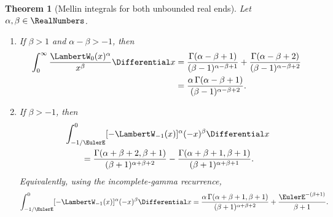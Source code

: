 \documentclass[11pt]{article}
\newtheorem{theorem}{Theorem}[section]
\theoremstyle{remark}
\newcommand{\Wz}{\LambertW_{0}}
\newcommand{\Wm}{\LambertW_{-1}}
\begin{document}
\begin{theorem}[Mellin integrals for both unbounded real ends]
\label{thm:mellin-integrals}
Let \(\alpha,\beta\in\RealNumbers\).
\begin{enumerate}[label=\textup{(\roman*)}]
\item If \(\beta>1\) and \(\alpha-\beta>-1\), then
\begin{align}
 \int_0^\infty \frac{\Wz(x)^\alpha}{x^\beta}\Differential x
 &=\frac{\Gamma(\alpha-\beta+1)}
       {(\beta-1)^{\alpha-\beta+1}}
  +\frac{\Gamma(\alpha-\beta+2)}
       {(\beta-1)^{\alpha-\beta+2}}
 \label{eq:mellin-W0}\\
 &=\frac{\alpha\,\Gamma(\alpha-\beta+1)}
 { (\beta-1)^{\alpha-\beta+2}}.
 \label{eq:mellin-W0-simple}
\end{align}
\item If \(\beta>-1\), then
\begin{align}
 &\int_{-1/\EulerE}^{0}
   [-\Wm(x)]^\alpha(-x)^\beta\Differential x\notag\\
 &\qquad=
 \frac{\Gamma(\alpha+\beta+2,\beta+1)}
      {(\beta+1)^{\alpha+\beta+2}}
 -\frac{\Gamma(\alpha+\beta+1,\beta+1)}
      {(\beta+1)^{\alpha+\beta+1}}.
 \label{eq:mellin-Wm}
\end{align}
Equivalently, using the incomplete-gamma recurrence,
\begin{equation}\label{eq:mellin-Wm-simple}
 \int_{-1/\EulerE}^{0}
   [-\Wm(x)]^\alpha(-x)^\beta\Differential x
 =\frac{\alpha\,\Gamma(\alpha+\beta+1,\beta+1)}
       {(\beta+1)^{\alpha+\beta+2}}
  +\frac{\EulerE^{-(\beta+1)}}{\beta+1}.
\end{equation}
\end{enumerate}
\end{theorem}
\end{document}
